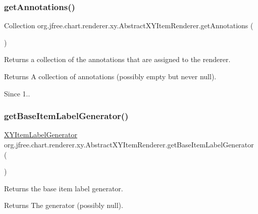 \subsubsection{\texorpdfstring{get\+Annotations()}{getAnnotations()}}
{\footnotesize\ttfamily Collection org.\+jfree.\+chart.\+renderer.\+xy.\+Abstract\+X\+Y\+Item\+Renderer.\+get\+Annotations (\begin{DoxyParamCaption}{ }\end{DoxyParamCaption})}

Returns a collection of the annotations that are assigned to the renderer.

\begin{DoxyReturn}{Returns}
A collection of annotations (possibly empty but never {\ttfamily null}).
\end{DoxyReturn}
\begin{DoxySince}{Since}
1.. 
\end{DoxySince}
\mbox{\label{classorg_1_1jfree_1_1chart_1_1renderer_1_1xy_1_1_abstract_x_y_item_renderer_afee247586678303556027473d842c91b}} 
\subsubsection{\texorpdfstring{get\+Base\+Item\+Label\+Generator()}{getBaseItemLabelGenerator()}}
{\footnotesize\ttfamily \mbox{\hyperlink{interfaceorg_1_1jfree_1_1chart_1_1labels_1_1_x_y_item_label_generator}{X\+Y\+Item\+Label\+Generator}} org.\+jfree.\+chart.\+renderer.\+xy.\+Abstract\+X\+Y\+Item\+Renderer.\+get\+Base\+Item\+Label\+Generator (\begin{DoxyParamCaption}{ }\end{DoxyParamCaption})}

Returns the base item label generator.

\begin{DoxyReturn}{Returns}
The generator (possibly {\ttfamily null}). 
\end{DoxyReturn}


